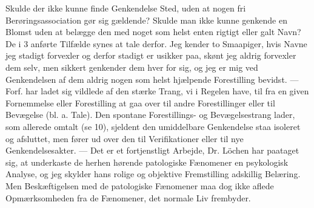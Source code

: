\documentclass[12pt,a4paper,openany]{book}
\begin{document}
Skulde der ikke kunne finde Genkendelse Sted, uden at nogen fri
Berøringsassociation gør sig gældende? Skulde man ikke kunne genkende en Blomst
uden at belægge den med noget som helst enten rigtigt eller galt Navn? De i 3
anførte Tilfælde synes at tale derfor. Jeg kender to Smaapiger, hvis Navne jeg
stadigt forvexler og derfor stadigt er usikker paa, skønt jeg aldrig forvexler
dem selv, men sikkert genkender dem hver for sig, og jeg er mig ved
Genkendelsen af dem aldrig nogen som helst hjælpende Forestilling bevidst. ---
Forf. har ladet sig vildlede af den stærke Trang, vi i Regelen have, til fra en
given Fornemmelse eller Forestilling at gaa over til andre Forestillinger eller
til Bevægelse (bl. a. Tale). Den spontane Forestillings- og Bevægelsestrang
lader, som allerede omtalt (se 10), sjeldent den umiddelbare Genkendelse staa
isoleret og afsluttet, men fører ud over den til Verifikationer eller til nye
Genkendelsesakter. --- Det er et fortjenstligt Arbejde, Dr. Löchen har paataget
sig, at underkaste de herhen hørende patologiske Fænomener en psykologisk
Analyse, og jeg skylder hans rolige og objektive Fremstilling adskillig
Belæring. Men Beskæftigelsen med de patologiske Fænomener maa dog ikke aflede
Opmærksomheden fra de Fænomener, det normale Liv frembyder.
\end{document}
